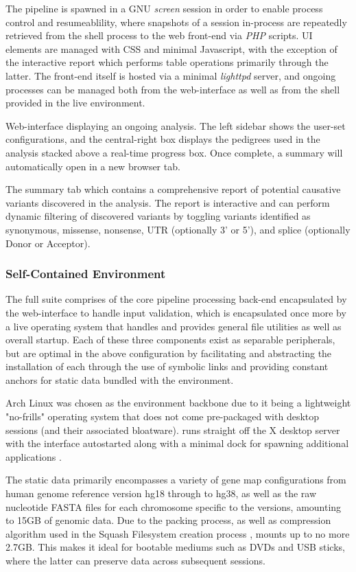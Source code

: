 The pipeline is spawned in a GNU \textit{screen} session in order to enable process control and resumeablility, where snapshots of a session in-process are repeatedly retrieved from the shell process to the web front-end via \textit{PHP} scripts. UI elements are managed with CSS and minimal Javascript, with the exception of the interactive report which performs table operations primarily through the latter. The front-end itself is hosted via a minimal \textit{lighttpd} server, and ongoing \app processes can be managed both from the web-interface as well as from the shell provided in the live environment.

{Web-interface displaying an ongoing analysis. The left sidebar shows the user-set configurations, and the central-right box displays the pedigrees used in the analysis stacked above a real-time progress box. Once complete, a summary will automatically open in a new browser tab.}

{The summary tab which contains a comprehensive report of potential causative variants discovered in the analysis. The report is interactive and can perform dynamic filtering of discovered variants by toggling variants identified as synonymous, missense, nonsense, UTR (optionally 3' or 5'), and splice (optionally Donor or Acceptor).}



\subsubsection{Self-Contained Environment}

The full \app suite comprises of the core pipeline processing back-end encapsulated by the web-interface to handle input validation, which is encapsulated once more by a live operating system that handles and provides general file utilities as well as overall startup. Each of these three components exist as separable peripherals, but are optimal in the above configuration by facilitating and abstracting the installation of each through the use of symbolic links and providing constant anchors for static data bundled with the environment.

Arch Linux was chosen as the environment backbone due to it being a lightweight "no-frills" operating system that does not come pre-packaged with desktop sessions (and their associated bloatware). \app runs straight off the X desktop server with the \app interface autostarted along with a minimal dock for spawning additional applications \citep{scheifler1986x}.

The static data primarily encompasses a variety of gene map configurations from human genome reference version hg18 through to hg38, as well as the raw nucleotide FASTA files for each chromosome specific to the versions, amounting to 15GB of genomic data. Due to the packing process, as well as compression algorithm used in the Squash Filesystem creation process \citep{lougher2008squashfs}, \app mounts up to no more 2.7GB. This makes it ideal for bootable mediums such as DVDs and USB sticks, where the latter can preserve data across subsequent sessions.


